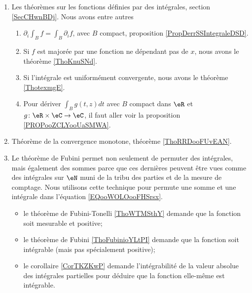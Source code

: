 \begin{enumerate}
    \item 
        Les théorèmes sur les fonctions définies par des intégrales, section \ref{SecCHwnBDj}. Nous avons entre autres
        \begin{enumerate}
            \item
                \( \partial_i\int_Bf=\int_B\partial_if\), avec \( B\) compact, proposition \ref{PropDerrSSIntegraleDSD}.
            \item
                Si \( f\) est majorée par une fonction ne dépendant pas de \( x\), nous avons le théorème \ref{ThoKnuSNd}.
            \item
                Si l'intégrale est uniformément convergente, nous avons le théorème \ref{ThotexmgE}.
            \item
                Pour dériver \( \int_Bg(t,z)dt\) avec \( B\) compact dans \( \eR\) et \( g\colon \eR\times \eC\to \eC\), il faut aller voir la proposition \ref{PROPooZCLYooUaSMWA}.
        \end{enumerate}
    \item 
        Théorème de la convergence monotone, théorème \ref{ThoRRDooFUvEAN}.
    \item
        Le théorème de Fubini permet non seulement de permuter des intégrales, mais également des sommes parce que ces dernières peuvent être vues comme des intégrales sur \( \eN\) muni de la tribu des parties et de la mesure de comptage. Nous utilisons cette technique pour permute une somme et une intégrale dans l'équation \eqref{EQooWOLOooFHSrsx}.
\begin{itemize}
    \item
        le théorème de Fubini-Tonelli \ref{ThoWTMSthY} demande que la fonction soit mesurable et positive;
    \item
        le théorème de Fubini \ref{ThoFubinioYLtPI} demande que la fonction soit intégrable (mais pas spécialement positive);
    \item
        le corollaire \ref{CorTKZKwP} demande l'intégrabilité de la valeur absolue des intégrales partielles pour déduire que la fonction elle-même est intégrable.
\end{itemize}


\end{enumerate}

